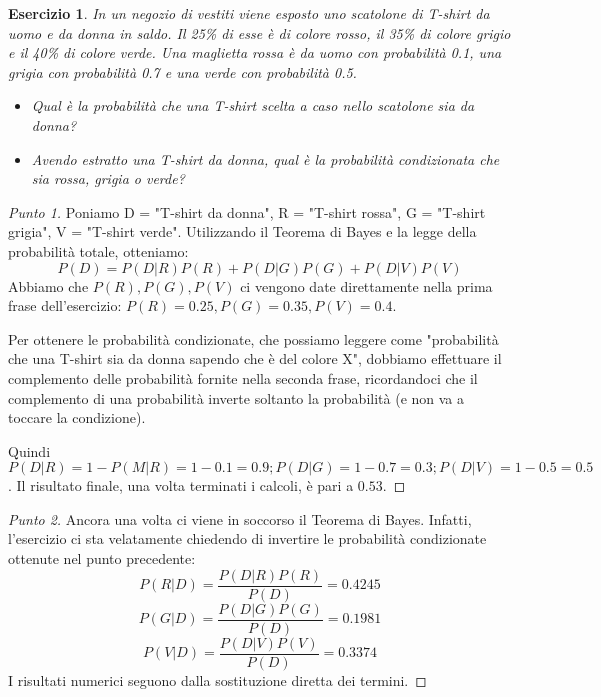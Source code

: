 \documentclass[12pt]{article}
\newtheorem{theorem}{Esercizio}
\renewcommand\qedsymbol{$\square$}
\begin{document}
\begin{theorem}
In un negozio di vestiti viene esposto uno scatolone di T-shirt da uomo e da donna in saldo. Il 25\% di esse è di colore rosso, il 35\% di colore grigio e il 40\% di colore verde. 
Una maglietta rossa è da uomo con probabilità 0.1, una grigia con probabilità 0.7 e una verde con probabilità 0.5.
\begin{itemize}
    \item Qual è la probabilità che una T-shirt scelta a caso nello scatolone sia da donna?
    \item Avendo estratto una T-shirt da donna, qual è la probabilità condizionata che sia rossa, grigia o verde?
\end{itemize}
\end{theorem}

\renewcommand\qedsymbol{$\square$}

\begin{proof}[Punto 1]
Poniamo D = "T-shirt da donna", R = "T-shirt rossa", G = "T-shirt grigia", V = "T-shirt verde". Utilizzando il Teorema di Bayes e la legge della probabilità totale, otteniamo:
$$
P(D) = P(D|R)P(R) + P(D|G)P(G) + P(D|V)P(V)
$$
Abbiamo che $P(R), P(G), P(V)$ ci vengono date direttamente nella prima frase dell'esercizio: $P(R) = 0.25, P(G)=0.35, P(V)=0.4$. 

Per ottenere le probabilità condizionate, che possiamo leggere come "probabilità che una T-shirt sia da donna sapendo che è del colore X", dobbiamo effettuare il complemento delle probabilità fornite nella seconda frase, ricordandoci che il complemento di una probabilità inverte soltanto la probabilità (e non va a toccare la condizione). 

Quindi $P(D|R) = 1 - P(M|R) = 1 - 0.1 = 0.9; P(D|G) = 1 - 0.7 = 0.3; P(D|V) = 1 - 0.5 = 0.5$. Il risultato finale, una volta terminati i calcoli, è pari a $0.53$.
\end{proof}

\renewcommand\qedsymbol{$\blacksquare$}

\begin{proof}[Punto 2]
Ancora una volta ci viene in soccorso il Teorema di Bayes. Infatti, l'esercizio ci sta velatamente chiedendo di invertire le probabilità condizionate ottenute nel punto precedente:
$$
P(R|D) = \frac{P(D|R)P(R)}{P(D)} = 0.4245
$$
$$
P(G|D) = \frac{P(D|G)P(G)}{P(D)} = 0.1981
$$
$$
P(V|D) = \frac{P(D|V)P(V)}{P(D)} = 0.3374
$$
I risultati numerici seguono dalla sostituzione diretta dei termini.
\end{proof}
\end{document}
